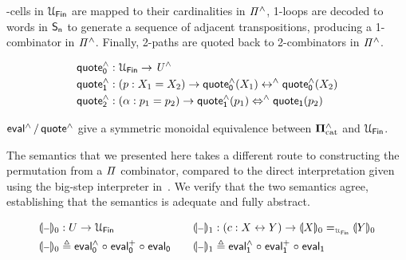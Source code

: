 -cells in $\UFin$ are mapped to their cardinalities in $\mathit{{\Pi}^{\wedge}}$, 1-loops are decoded to words in $\Sn$ to
generate a sequence of adjacent transpositions, producing a 1-combinator in $\mathit{{\Pi}^{\wedge}}$. Finally, 2-paths are quoted
back to 2-combinators in $\mathit{{\Pi}^{\wedge}}$.

\begin{definition}[$\quoteh$]
  \begin{align*}
    \quoteh_{0} & : \UFin \to \UHat                                                            \\
    \quoteh_{1} & : (p : X_{1} \id X_{2}) \to \quoteh_{0}(X_{1}) \isoh \quoteh_{0}(X_{2})      \\
    \quoteh_{2} & : (\alpha : p_{1} \id p_{2}) \to \quoteh_{1}(p_{1}) \Isoh \quotet_{1}(p_{2})
  \end{align*}
\end{definition}


\begin{theorem}
  $\evalh/\quoteh$ give a symmetric monoidal equivalence between $\mathbf{\Pi}^{\wedge}_{\mathrm{cat}}$ and $\UFin$.
\end{theorem}

The semantics that we presented here takes a different route to constructing the permutation from a $\mathit{\Pi}$
combinator, compared to the direct interpretation given using the big-step interpreter in~. We
verify that the two semantics agree, establishing that the semantics is adequate and fully abstract.

\begin{definition}[${\gdenot{\blank}}$]
  \begin{gather*}
    \begin{aligned}
      \gdenot{\blank}_{0} & : U \to \UFin                                       \\
      \gdenot{\blank}_{0} & \defeq \evalh_{0} \comp \evalp_{0} \comp \evalt_{0}
    \end{aligned}
    \qquad
    \begin{aligned}
      \gdenot{\blank}_{1} & : (c : X \iso Y) \to \gdenot{X}_{0} \id_{\UFin} \gdenot{Y}_{0} \\
      \gdenot{\blank}_{1} & \defeq \evalh_{1} \comp \evalp_{1} \comp \evalt_{1}
    \end{aligned}
  \end{gather*}
\end{definition}

